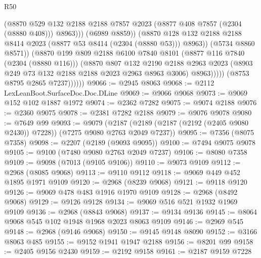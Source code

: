 \begin{lexlean}{R50}
\begin{coremodule}
                              (@8870
                                @529
                                @132
                                @2188
                                @2188
                                @7857
                                @2023
                                (@8877 @408 @7857 (@2304 (@8880 @408)))
                                @8963)))
                          (@6989 @8859))
                        (@8870
                          @128
                          @132
                          @2188
                          @2188
                          @8414
                          @2023
                          (@8877 @53 @8414 (@2304 (@8880 @53)))
                          @8963))
                      (@5734 @8860 @8571))
                    (@8870
                      @199
                      @809
                      @2188
                      @6100
                      @7840
                      @8101
                      (@8877 @116 @7840 (@2304 (@8880 @116)))
                      (@8870
                        @807
                        @132
                        @2190
                        @2188
                        @2963
                        @2023
                        (@8903 @249 @73 @132 @2188 @2188 @2023 @2963 @8963 @3006)
                        @8963)))))
              (@8753 @8795 @2865 @7237))))))
@9066 := @2945 @8063
@9068 := @2112 LexLeanBoot.SurfaceDoc.Doc.DLine
@9069 := @9066 @9068
@9073 := @9069 @152 @102 @1887 @1972
@9074 := @2362 @7282
@9075 := @9074 @2188
@9076 := @2360 @9075
@9078 := @2381 @7282 @2188
@9079 := @9076 @9078
@9080 := @7649 @99
@9093 := @9079
    (@2187 (@2189 (@2187 (@2192 (@2405 @9080 @2430)) @7228)) (@7275 @9080 @2763 @2049 @7237))
@9095 := @7356 (@8075 @7358)
@9098 := @2207 (@2189 (@9093 @9095))
@9100 := @7494 @9075 @9078
@9105 := @9100 (@7480 @9080 @2763 @2049 @7237)
@9106 := @8080 @7358
@9109 := @9098 (@7013 (@9105 @9106))
@9110 := @9073 @9109
@9112 := @2968 (@8085 @9068)
@9113 := @9110 @9112
@9118 := @9069 @449 @452 @1895 @1971 @9109
@9120 := @2968 (@8239 @9068)
@9121 := @9118 @9120
@9126 := @9069 @478 @483 @1916 @1970 @9109
@9128 := @2968 (@8492 @9068)
@9129 := @9126 @9128
@9134 := @9069 @516 @521 @1932 @1969 @9109
@9136 := @2968 (@8843 @9068)
@9137 := @9134 @9136
@9145 := @8064 @9068 @545 @102 @1948 @1968 @2023 @8063 @9109
@9146 := @2969 @545
@9148 := @2968 (@9146 @9068)
@9150 := @9145 @9148 @8090
@9152 := @3166 @8063 @485
@9155 := @9152 @1941 @1947 @2188
@9156 := @8201 @99
@9158 := @2405 @9156 @2430
@9159 := @2192 @9158
@9161 := @2187 @9159 @7228

\end{coremodule}
\end{lexlean}
